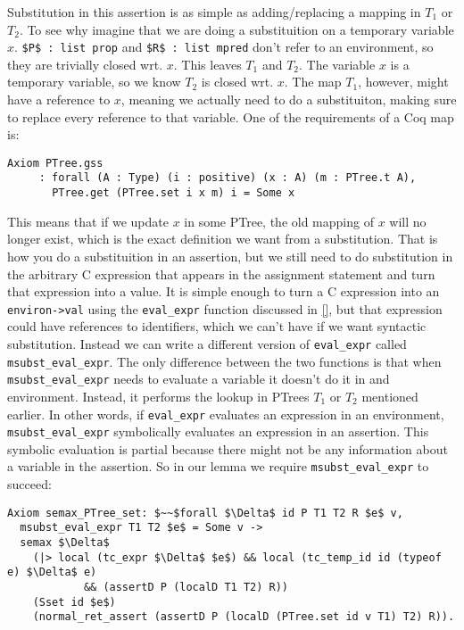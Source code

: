 \documentclass{puthesis}
\begin{document}
Substitution in this assertion is 
as simple as adding/replacing a mapping in $T_1$ or $T_2$. To see why imagine
that we are doing a substituition on a temporary variable $x$. 
\lstinline|$P$ : list prop| and \lstinline|$R$ : list mpred| don't
refer to an environment, so they are trivially closed wrt.
$x$. This leaves $T_1$ and $T_2$. The variable $x$
is a temporary variable, so we know $T_2$ is closed wrt. $x$.
The map $T_1$, however, might have a reference to $x$, meaning
we actually need to do a substituiton, making sure to replace every reference
to that variable. One of the requirements of a Coq map is:

\begin{lstlisting}
Axiom PTree.gss
     : forall (A : Type) (i : positive) (x : A) (m : PTree.t A),
       PTree.get (PTree.set i x m) i = Some x
\end{lstlisting}

This means that if we update $x$ in some PTree, the old
mapping of $x$ will no longer exist, which is the exact
definition we want from a substitution. That is how you do a substituition
in an assertion, but we still need to do substitution in the arbitrary
C expression that appears in the assignment statement and turn that expression
into a value. It is simple enough to turn a C expression
into an \lstinline|environ->val| using the \lstinline|eval_expr| function
discussed in \ref{}, but that expression could have references to identifiers,
which we can't have if we want syntactic substitution. Instead we can write
a different version of \lstinline|eval_expr| called 
\lstinline|msubst_eval_expr|. The only difference between the two functions
is that when \lstinline|msubst_eval_expr| needs to evaluate a variable it
doesn't do it in and environment. Instead, it performs the lookup in 
PTrees $T_1$ or $T_2$ mentioned earlier. In other words, if
\lstinline|eval_expr| evaluates an expression in an environment, 
\lstinline|msubst_eval_expr| symbolically evaluates an expression
in an assertion. This symbolic evaluation is partial because there might
not be any information about a variable in the assertion. So in our
lemma we require \lstinline|msubst_eval_expr| to succeed:

\begin{lstlisting}
Axiom semax_PTree_set: $~~$forall $\Delta$ id P T1 T2 R $e$ v,
  msubst_eval_expr T1 T2 $e$ = Some v ->
  semax $\Delta$
    (|> local (tc_expr $\Delta$ $e$) && local (tc_temp_id id (typeof e) $\Delta$ e) 
            && (assertD P (localD T1 T2) R))
    (Sset id $e$)
    (normal_ret_assert (assertD P (localD (PTree.set id v T1) T2) R)).
\end{lstlisting}
\end{document}
